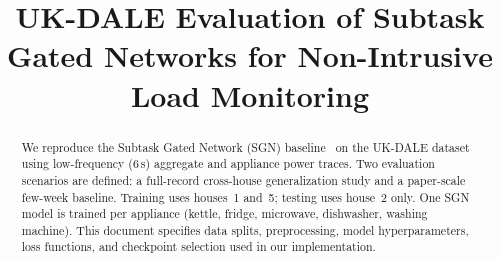 \documentclass[conference]{IEEEtran}
\begin{document}
\title{UK-DALE Evaluation of Subtask Gated Networks for Non-Intrusive Load Monitoring}

\author{
\and
{}
\and
{}
\and
{}
\and
{}
}

\maketitle

\begin{abstract}
We reproduce the Subtask Gated Network (SGN) baseline~\cite{shin2019sgn} on the UK-DALE dataset using low-frequency (6\,s) aggregate and appliance power traces.
Two evaluation scenarios are defined: a full-record cross-house generalization study and a paper-scale few-week baseline.
Training uses houses~1 and~5; testing uses house~2 only.
One SGN model is trained per appliance (kettle, fridge, microwave, dishwasher, washing machine).
This document specifies data splits, preprocessing, model hyperparameters, loss functions, and checkpoint selection used in our implementation.
\end{abstract}
\end{document}
